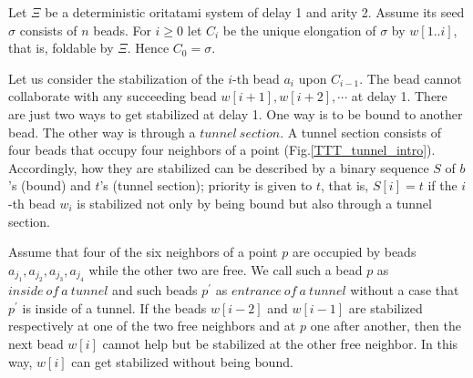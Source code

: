 \documentclass[runningheads]{llncs}
\begin{document}


Let $\Xi$ be a deterministic oritatami system of delay 1 and arity 2. Assume its seed $\sigma$ consists of $n$ beads.
For $i \geq 0$ let $C_i$ be the unique elongation of $\sigma$ by $w[1..i]$, that is, foldable by $\Xi$. Hence $C_0 = \sigma$.


Let us consider the stabilization of the $i$-th bead $a_i$ upon $C_{i-1}$. The bead cannot collaborate with any succeeding bead $w[i+1],w[i+2],\cdots$ at delay 1. There are just two ways to get stabilized at delay 1. One way is to be bound to another bead. The other way is through a $tunnel\ section$. A tunnel section consists of four beads that occupy four neighbors of a point (Fig.\ref{TTT_tunnel_intro}). 
Accordingly, how they are stabilized can be described by a binary sequence $S$ of $b$'s (bound) and $t$'s (tunnel section); priority is given to $t$, that is, $S[i] = t$ if the $i$-th bead $w_i$ is stabilized not only by being bound but also through a tunnel section. 

Assume that four of the six neighbors of a point $p$ are occupied by beads $a_{j_1},a_{j_2},a_{j_3},a_{j_4}$ while the other two are free. We call such a bead $p$ as $inside\ of\ a\ tunnel$ and such beads $p^\prime$ as $entrance\ of\ a\ tunnel$ without a case that $p^\prime$ is inside of a tunnel. If the beads $w[i-2]$ and $w[i-1]$ are stabilized respectively at one of the two free neighbors and at $p$ one after another, then the next bead $w[i]$ cannot help but be stabilized at the other free neighbor. In this way, $w[i]$ can get stabilized without being bound.

\end{document}

